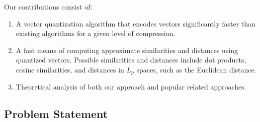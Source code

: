 Our contributions consist of:
\begin{enumerate}
\item A vector quantization algorithm that encodes vectors significantly faster than existing algorithms for a given level of compression.
\item A fast means of computing approximate similarities and distances using quantized vectors. Possible similarities and distances include dot products, cosine similarities, and distances in $L_p$ spaces, such as the Euclidean distance.
\item Theoretical analysis of both our approach and popular related approaches.
\end{enumerate}















\subsection{Problem Statement}

